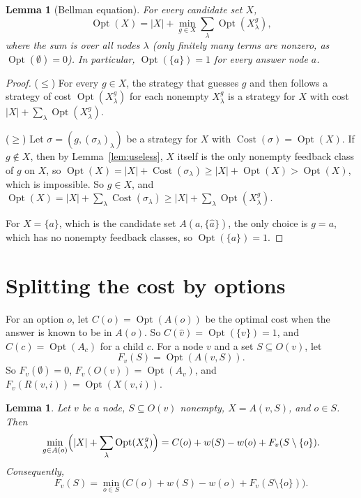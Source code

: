 \documentclass[11pt]{article}
\newtheorem{lemma}[theorem]{Lemma}
\newcommand{\Opt}{\operatorname{Opt}}
\newcommand{\Cost}{\operatorname{Cost}}
\begin{document}
\begin{lemma}[Bellman equation]
  \label{lem:bellman}
  For every candidate set $X$,
  \[
    \Opt(X) = |X| + \min_{g \in X} \sum_\lambda \Opt(X^g_\lambda),
  \]
  where the sum is over all nodes $\lambda$ (only finitely many terms are
  nonzero, as $\Opt(\emptyset) = 0$). In particular, $\Opt(\{a\}) = 1$ for every
  answer node $a$.
\end{lemma}

\begin{proof}
  ($\le$) For every $g \in X$, the strategy that guesses $g$ and then follows a
  strategy of cost $\Opt(X^g_\lambda)$ for each nonempty $X^g_\lambda$ is a
  strategy for $X$ with cost $|X| + \sum_\lambda \Opt(X^g_\lambda)$.

  ($\ge$) Let $\sigma = (g, (\sigma_\lambda)_\lambda)$ be a strategy for $X$ with
  $\Cost(\sigma) = \Opt(X)$. If $g \notin X$, then by Lemma~\ref{lem:useless},
  $X$ itself is the only nonempty feedback class of $g$ on $X$, so
  $\Opt(X) = |X| + \Cost(\sigma_\lambda) \ge |X| + \Opt(X) > \Opt(X)$, which is
  impossible. So $g \in X$, and
  $\Opt(X) = |X| + \sum_\lambda \Cost(\sigma_\lambda) \ge
  |X| + \sum_\lambda \Opt(X^g_\lambda)$.

  For $X = \{a\}$, which is the candidate set $A(a, \{\hat a\})$, the only
  choice is $g = a$, which has no nonempty feedback classes, so
  $\Opt(\{a\}) = 1$.
\end{proof}

\section{Splitting the cost by options}
\label{sec:split}

For an option $o$, let $C(o) = \Opt(A(o))$ be the optimal cost when the answer is
known to be in $A(o)$. So $C(\hat v) = \Opt(\{v\}) = 1$, and $C(c) = \Opt(A_c)$
for a child $c$. For a node $v$ and a set $S \subseteq O(v)$, let
\[
  F_v(S) = \Opt(A(v, S)).
\]
So $F_v(\emptyset) = 0$, $F_v(O(v)) = \Opt(A_v)$, and
$F_v(R(v, i)) = \Opt(X(v, i))$.

\begin{lemma}
  \label{lem:split}
  Let $v$ be a node, $S \subseteq O(v)$ nonempty, $X = A(v, S)$, and $o \in S$.
  Then
  \[
    \min_{g \in A(o)} \Bigl( |X| + \sum_\lambda \Opt(X^g_\lambda) \Bigr)
    = C(o) + w(S) - w(o) + F_v(S \setminus \{o\}).
  \]
  Consequently,
  \[
    F_v(S) = \min_{o \in S}
      \bigl( C(o) + w(S) - w(o) + F_v(S \setminus \{o\}) \bigr).
  \]
\end{lemma}
\end{document}
